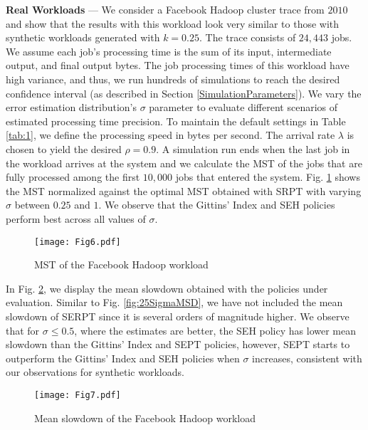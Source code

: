 \textbf{Real Workloads} --- We consider a Facebook Hadoop cluster trace from $2010$ \cite{chen2012interactive} and show that the results with this workload look very similar to those with synthetic workloads generated with $ k = 0.25$. The trace consists of $24,443$ jobs. We assume each job's processing time is the sum of its input, intermediate output, and final output bytes. The job processing times of this workload have high variance, and thus, we run hundreds of simulations to reach the desired confidence interval (as described in Section \ref{SimulationParameters}). We vary the error estimation distribution's $\sigma$ parameter to evaluate different scenarios of estimated processing
time precision. To maintain the default settings in Table \ref{tab:1}, we define the processing speed in bytes per second. The arrival rate $\lambda$ is chosen to yield the desired $\rho = 0.9$. A simulation run ends when the last job in the workload arrives at the system and we calculate the MST of the jobs that are fully processed among the first $10,000$ jobs that entered the system. Fig. \ref{fig:HadoopMST} shows the MST normalized against the optimal MST obtained with SRPT with varying $\sigma$ between $0.25$ and $1$. We observe that the Gittins' Index and SEH policies perform best across all values of $\sigma$.
\begin{figure}[ht]

  \texttt{[image: Fig6.pdf]}
  \centering
    \caption{MST of the Facebook Hadoop workload}
  \label{fig:HadoopMST}

\end{figure} 

In Fig. \ref{fig:HadoopMSD}, we display the mean slowdown obtained with the policies under evaluation. Similar to Fig. \ref{fig:25SigmaMSD}, we have not included the mean slowdown of SERPT since it is several orders of magnitude higher. We observe that for $\sigma \le 0.5$, where the estimates are better, the SEH policy has lower mean slowdown than the Gittins' Index and SEPT policies, however, SEPT starts to outperform the Gittins' Index and SEH policies when $\sigma$ increases, consistent with our observations for synthetic workloads. 




\begin{figure}[ht]

  \texttt{[image: Fig7.pdf]}
  \centering
    \caption{Mean slowdown of the Facebook Hadoop workload}
  \label{fig:HadoopMSD}

\end{figure}

